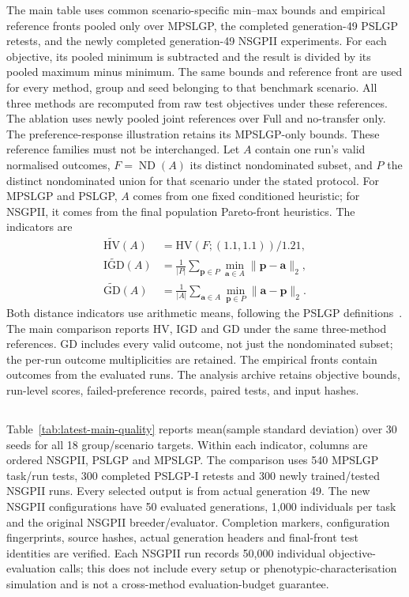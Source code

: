 The main table uses common scenario-specific min--max bounds and empirical reference fronts pooled only over MPSLGP, the completed generation-49 PSLGP retests, and the newly completed generation-49 NSGPII experiments. For each objective, its pooled minimum is subtracted and the result is divided by its pooled maximum minus minimum. The same bounds and reference front are used for every method, group and seed belonging to that benchmark scenario. All three methods are recomputed from raw test objectives under these references. The ablation uses newly pooled joint references over Full and no-transfer only. The preference-response illustration retains its MPSLGP-only bounds. These reference families must not be interchanged. Let $A$ contain one run's valid normalised outcomes, $F=\operatorname{ND}(A)$ its distinct nondominated subset, and $P$ the distinct nondominated union for that scenario under the stated protocol. For MPSLGP and PSLGP, $A$ comes from one fixed conditioned heuristic; for NSGPII, it comes from the final population Pareto-front heuristics. The indicators are
\begin{equation}
\begin{aligned}
\widetilde{\mathrm{HV}}(A)&=\mathrm{HV}(F;(1.1,1.1))/1.21,\\
\widetilde{\mathrm{IGD}}(A)&=\frac{1}{|P|}\sum_{\mathbf p\in P}\min_{\mathbf a\in A}\|\mathbf p-\mathbf a\|_2,\\
\widetilde{\mathrm{GD}}(A)&=\frac{1}{|A|}\sum_{\mathbf a\in A}\min_{\mathbf p\in P}\|\mathbf a-\mathbf p\|_2.
\end{aligned}
\label{eq:descriptive-test-metrics}
\end{equation}
Both distance indicators use arithmetic means, following the PSLGP definitions~\cite{xu2026pslgp}. The main comparison reports HV, IGD and GD under the same three-method references. GD includes every valid outcome, not just the nondominated subset; the per-run outcome multiplicities are retained. The empirical fronts contain outcomes from the evaluated runs. The analysis archive retains objective bounds, run-level scores, failed-preference records, paired tests, and input hashes.

\subsection{}
Table~\ref{tab:latest-main-quality} reports mean(sample standard deviation) over 30 seeds for all 18 group/scenario targets. Within each indicator, columns are ordered NSGPII, PSLGP and MPSLGP. The comparison uses 540 MPSLGP task/run tests, 300 completed PSLGP-I retests and 300 newly trained/tested NSGPII runs. Every selected output is from actual generation 49. The new NSGPII configurations have 50 evaluated generations, 1,000 individuals per task and the original NSGPII breeder/evaluator. Completion markers, configuration fingerprints, source hashes, actual generation headers and final-front test identities are verified. Each NSGPII run records 50,000 individual objective-evaluation calls; this does not include every setup or phenotypic-characterisation simulation and is not a cross-method evaluation-budget guarantee.

